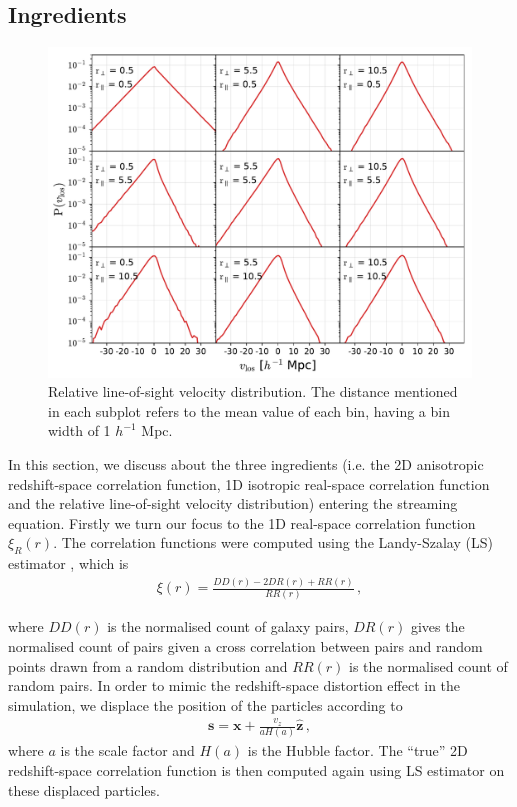 \documentclass[a4paper,fleqn,usenatbib]{mnras}
\begin{document}
	\subsection{Ingredients}
	
	\begin{figure}
		\centering
		\includegraphics[scale=0.88]{rel_los_grid}
		\caption{Relative line-of-sight velocity distribution. The distance mentioned in each subplot refers to the mean value of each bin, having a bin width of 1 $h^{-1}$ Mpc.}
		\label{fig:rel_los}
	\end{figure}
	
	In this section, we discuss about the three ingredients (i.e. the 2D anisotropic redshift-space correlation function, 1D isotropic real-space correlation function and the relative line-of-sight velocity distribution) entering the streaming equation. Firstly we turn our focus to the 1D real-space correlation function $\xi_R(r)$. The correlation functions were computed using the Landy-Szalay (LS) estimator \citep{ls93}, which is
	\begin{eqnarray}
	\xi(r) = \frac{DD(r) - 2DR(r) + RR(r)}{RR(r)} \, ,
	\end{eqnarray}
	
	\noindent where $DD(r)$ is the normalised count of galaxy pairs, $DR(r)$ gives the normalised count of pairs given a cross correlation between pairs and random points drawn from a random distribution  and $RR(r)$ is the normalised count of random pairs. In order to mimic the redshift-space distortion effect in the simulation, we displace the position of the particles according to
	\begin{eqnarray}
	\mathbf{s} = \mathbf{x} + \frac{v_z}{aH(a)}\hat{\mathbf{z}} \, ,
	\end{eqnarray}
	\noindent where $a$ is the scale factor and $H(a)$ is the Hubble factor. The ``true'' 2D redshift-space correlation function  is then computed again using LS estimator on these displaced particles.
	
\end{document}
